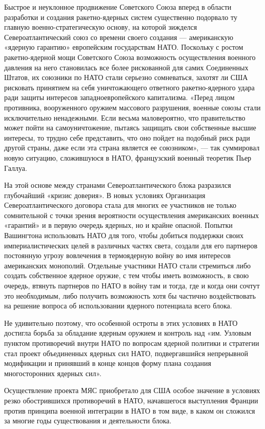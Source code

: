 \documentclass[12pt, a4paper, openany]{book}
\begin{document}
		Быстрое и неуклонное продвижение Советского Союза вперед в области разработки и создания ракетно-ядерных систем существенно подорвало ту главную военно-стратегическую основу, на которой зижделся Североатлантический союз со времени своего создания — американскую «ядерную гарантию» европейским государствам НАТО. Поскольку с ростом ракетно-ядерной мощи Советского Союза возможность осуществления военного давления на него становилась все более рискованной для самих Соединенных Штатов, их союзники по НАТО стали серьезно сомневаться, захотят ли США рисковать принятием на себя уничтожающего ответного ракетно-ядерного удара ради защиты интересов западноевропейского капитализма. «Перед лицом противника, вооруженного оружием массового разрушения, военные союзы стали исключительно ненадежными. Если весьма маловероятно, что правительство может пойти на самоуничтожение, пытаясь защищать свои собственные высшие интересы, то трудно себе представить, что оно пойдет на подобный риск ради другой страны, даже если эта страна является ее союзником», — так суммировал новую ситуацию, сложившуюся в НАТО, французский военный теоретик Пьер Галлуа.
		
		На этой основе между странами Североатлантического блока разразился глубочайший «кризис доверия». В новых условиях Организация Североатлантического договора стала для многих ее участников не только сомнительной с точки зрения вероятности осуществления американских военных «гарантий» и в первую очередь ядерных, но и крайне опасной. Попытки Вашингтона использовать НАТО для того, чтобы добиться поддержки своих империалистических целей в различных частях света, создали для его партнеров постоянную угрозу вовлечения в термоядерную войну во имя интересов американских монополий. Отдельные участники НАТО стали стремиться либо создать собственное ядерное оружие, с тем чтобы иметь возможность, в свою очередь, втянуть партнеров по НАТО в войну там и тогда, где и когда они сочтут это необходимым, либо получить возможность хотя бы частично воздействовать на решение вопроса об использовании ядерного потенциала всего блока.
		
		Не удивительно поэтому, что особенной остроты в этих условиях в НАТО достигла борьба за обладание ядерным оружием и контроль над «им. Узловым пунктом противоречий внутри НАТО по вопросам ядерной политики и стратегии стал проект объединенных ядерных сил НАТО, подвергавшийся непрерывной модификации и принявший в конце концов форму плана создания многосторонних ядерных сил».
		
		Осуществление проекта МЯС приобретало для США особое значение в условиях резко обострившихся противоречий в НАТО, начавшегося выступления Франции против принципа военной интеграции в НАТО в том виде, в каком он сложился за многие годы существования и деятельности блока.
		
\end{document}
